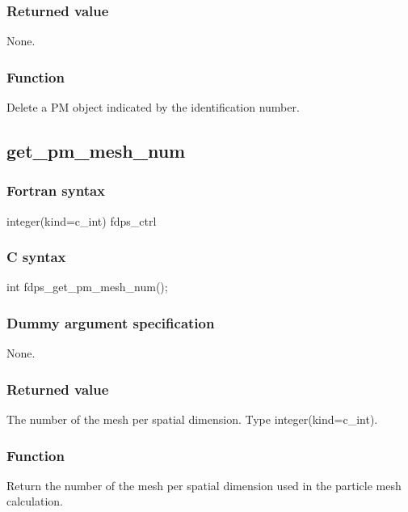 \subsubsection*{Returned value}
None.

\subsubsection*{Function}
Delete a PM object indicated by the identification number.
\clearpage

\subsection{get\_pm\_mesh\_num}
\subsubsection*{Fortran syntax}
\begin{screen}
\begin{spverbatim}
integer(kind=c_int) fdps_ctrl%
\end{spverbatim}
\end{screen}

\subsubsection*{C syntax}
\begin{screen}
\begin{spverbatim}
int fdps_get_pm_mesh_num();
\end{spverbatim}
\end{screen}

\subsubsection*{Dummy argument specification}
None.

\subsubsection*{Returned value}
The number of the mesh per spatial dimension.
Type integer(kind=c\_int). 

\subsubsection*{Function}
Return the number of the mesh per spatial dimension used in the particle mesh calculation.
\clearpage

